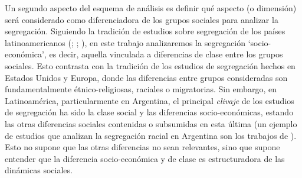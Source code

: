 \documentclass[
  spanish,
  a4paper,%
  chapterprefix=true,%
  DIV=calc,%
  twoside]{scrbook}%
\begin{document}
Un segundo aspecto del esquema de análisis es definir qué aspecto (o
dimensión) será considerado como diferenciadora de los grupos sociales
para analizar la segregación. Siguiendo la tradición de estudios sobre
segregación de los países latinoamericanos (; ; ), en este trabajo analizaremos la segregación
`socio-económica', es decir, aquella vinculada a diferencias de clase
entre los grupos sociales. Esto contrasta con la tradición de los
estudios de segregación hechos en Estados Unidos y Europa, donde las
diferencias entre grupos consideradas son fundamentalmente
étnico-religiosas, raciales o migratorias. Sin embargo, en
Latinoamérica, particularmente en Argentina, el principal \emph{clivaje} de
los estudios de segregación ha sido la clase social y las diferencias
socio-económicas, estando las otras diferencias sociales contenidas o
subsumidas en esta última (un ejemplo de estudios que analizan la
segregación racial en Argentina son los trabajos de ). Esto no
supone que las otras diferencias no sean relevantes, sino que supone
entender que la diferencia socio-económica y de clase es estructuradora
de las dinámicas sociales.
\end{document}
